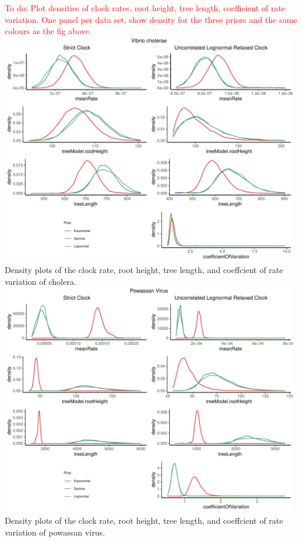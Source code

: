 \documentclass[10pt,letterpaper]{article}
\begin{document}
\begin{flushleft}
\textcolor{red}{To do: Plot densities of clock rates, root height, tree length, coefficient of rate variation. One panel per data set, show density for the three priors and the same colours as the fig above.}
            \includegraphics[width=13cm]{sandbox_figures/cholera_density_plot.pdf}\newline
            Density plots of the clock rate, root height, tree length, and coeffcient of rate variation of cholera.
            \includegraphics[width=13cm]{sandbox_figures/powv_density_plot.pdf}\newline
            Density plots of the clock rate, root height, tree length, and coeffcient of rate variation of powassan virus.

\end{flushleft}
\end{document}

